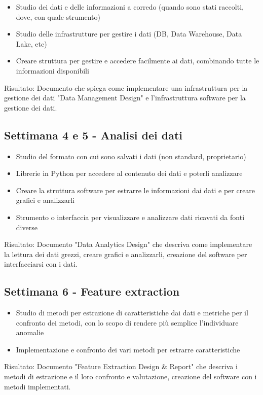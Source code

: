 \begin{itemize}
	\item Studio dei dati e delle informazioni a corredo (quando sono stati raccolti, dove, con quale strumento)
	\item Studio delle infrastrutture per gestire i dati (DB, Data Warehouse, Data Lake, etc)
	\item Creare struttura per gestire e  accedere facilmente ai dati, combinando tutte le informazioni disponibili
\end{itemize}
Risultato: Documento che spiega come implementare una infrastruttura per la gestione dei dati "Data Management Design" e l’infrastruttura software per la gestione dei dati.

\subsection{Settimana 4 e 5 - Analisi dei dati}

\begin{itemize}
	\item Studio del formato con cui sono salvati i dati (non standard, proprietario)
	\item Librerie in Python per accedere al contenuto dei dati e poterli analizzare
	\item Creare la struttura software per estrarre le informazioni dai dati e per creare grafici e analizzarli
	\item Strumento o interfaccia per visualizzare e analizzare dati ricavati da fonti diverse
\end{itemize}
Risultato: Documento "Data Analytics Design" che descriva come implementare la lettura dei dati grezzi, creare grafici e analizzarli, creazione del software per interfacciarsi con i dati.

\subsection{Settimana 6 - Feature extraction}

\begin{itemize}
	\item Studio di metodi per estrazione di caratteristiche dai dati e metriche per il confronto dei metodi, con lo scopo di rendere più semplice l’individuare anomalie
	\item Implementazione e confronto dei vari metodi per estrarre caratteristiche
\end{itemize}
Risultato: Documento "Feature Extraction Design \& Report" che descriva i metodi di estrazione e il loro confronto e valutazione, creazione del software con i metodi implementati.

